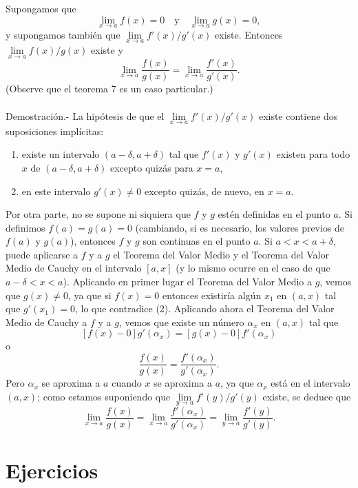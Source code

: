 \begin{teo}
    Supongamos que 
    $$\lim_{x\to a}f(x)=0 \quad \mbox{y}\quad \lim_{x\to a}g(x)=0,$$
    y supongamos también que $\lim\limits_{x\to a}f'(x)/g'(x)$ existe. Entonces $\lim\limits_{x\to a}f(x)/g(x)$ existe y 
    $$\lim_{x\to a}\dfrac{f(x)}{g(x)}=\lim_{x\to a}\dfrac{f'(x)}{g'(x)}.$$
    (Observe que el teorema 7 es un caso particular.)\\\\
	Demostración.-\; La hipótesis de que el $\lim\limits_{x\to a}f'(x)/g'(x)$ existe contiene dos suposiciones implícitas:
	\begin{enumerate}[(1)]
	    \item existe un intervalo $(a-\delta,a+\delta)$ tal que $f'(x)$ y $g'(x)$ existen para todo $x$ de $(a-\delta,a+\delta)$ excepto quizás para $x=a$,
	    \item en este intervalo $g'(x)\neq 0$ excepto quizás, de nuevo, en $x=a.$
	\end{enumerate}
\end{teo}
Por otra parte, no se supone ni siquiera que $f$ y $g$ estén definidas en el punto $a$. Si definimos $f(a)=g(a)=0$ (cambiando, si es necesario, los valores previos de $f(a)$ y $g(a)$), entonces $f$ y $g$ son continuas en el punto $a$. Si $a<x<a+\delta$, puede aplicarse a $f$ y a $g$ el Teorema del Valor Medio y el Teorema del Valor Medio de Cauchy en el intervalo $[a,x]$ (y lo mismo ocurre en el caso de que $a-\delta < x < a$). Aplicando en primer lugar el Teorema del Valor Medio a $g$, vemos que $g(x)\neq 0$, ya que si $f(x)=0$ entonces existiría algún $x_1$ en $(a,x)$ tal que $g'(x_1)=0$, lo que contradice (2). Aplicando ahora el Teorema del Valor Medio de Cauchy a $f$ y a $g$, vemos que existe un número $\alpha_x$ en $(a,x)$ tal que 
$$\left[f(x)-0\right]g'(\alpha_x)=\left[g(x)-0\right]f'(\alpha_x)$$
o
$$\dfrac{f(x)}{g(x)}=\dfrac{f'(\alpha_x)}{g'(\alpha_x)}.$$
Pero $\alpha_x$ se aproxima a $a$ cuando $x$ se aproxima a $a$, ya que $\alpha_x$ está en el intervalo $(a,x)$; como estamos suponiendo que $\lim\limits_{y\to a}f'(y)/g'(y)$ existe, se deduce que
$$\lim_{x\to a}\dfrac{f(x)}{g(x)}=\lim_{x\to a}\dfrac{f'(\alpha_x)}{g'(\alpha_x)}=\lim_{y\to a}\dfrac{f'(y)}{g'(y)}.$$


\section{Ejercicios}

